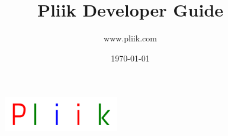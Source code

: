 \documentclass[10pt,letterpaper,titlepage]{article}
\author{www.pliik.com}
\title{Pliik Developer Guide}
\date{
\today
}
\begin{document}
\begin{figure}
\begin{center}
\includegraphics[width=50mm]{logo.png}
\end{center}
\end{figure}
\maketitle{}

\newpage




\end{document}
